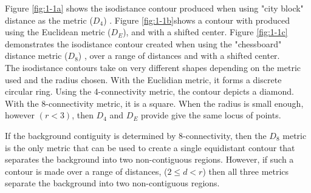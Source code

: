 \documentclass[aps,letterpaper,10pt]{article}
\begin{document}
Figure \ref{fig:1-1a} shows the isodistance contour produced when using "city block" distance as the metric ($D_4$) .  Figure \ref{fig:1-1b}shows a contour with produced using the Euclidean metric ($D_E$), and with a shifted center.  Figure \ref{fig:1-1c} demonstrates the isodistance contour created when using the "chessboard" distance metric ($D_8$) , over a range of distances and with a shifted center.\\

The isodistance contours take on very different shapes depending on the metric used and the radius chosen.  With the Euclidian metric, it forms a discrete circular ring.  Using the 4-connectivity metric, the contour depicts a diamond.  With the 8-connectivity metric, it is a square.
When the radius is small enough, however $(r<3)$, then $D_4$ and $D_E$ provide give the same locus of points. 

If the background contiguity is determined by 8-connectivity, then the $D_8$ metric is the only metric that can be used to create a single equidistant contour that separates the background into two non-contiguous regions.  However, if such a contour is made over a range of distances, ($2\leq d<r$) then all three metrics separate the background into two non-contiguous regions.

\newpage
\end{document}
